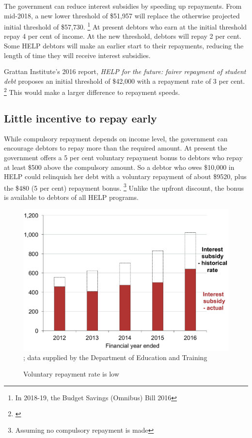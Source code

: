 \documentclass[embargoed]{grattan}
\begin{document}
The government can reduce interest subsidies by speeding up repayments.
From mid-2018, a new lower threshold of \$51,957 will replace the otherwise projected initial threshold of \$57,730.%
\footnote{In 2018-19, the Budget Savings (Omnibus) Bill 2016} At present debtors who earn at the initial threshold repay 4 per cent of income.
At the new threshold, debtors will repay 2 per cent.
Some \gls{HELP} debtors will make an earlier start to their repayments, reducing the length of time they will receive interest subsidies.

Grattan Institute's 2016 report, \emph{HELP for the future: fairer repayment of student debt} proposes an initial threshold of \$42,000 with a repayment rate of 3 per cent.%
\footnote{\textcite{Norton2016HELPfuturefairer}} This would make a larger difference to repayment speeds.

\subsection{Little incentive to repay early}\label{little-incentive-to-repay-early}

While compulsory repayment depends on income level, the government can encourage debtors to repay more than the required amount.
At present the government offers a 5 per cent voluntary repayment bonus to debtors who repay at least \$500 above the compulsory amount.
So a debtor who owes \$10,000 in \gls{HELP} could relinquish her debt with a voluntary repayment of about \$9520, plus the \$480 (5 per cent) repayment bonus.%
\footnote{Assuming no compulsory repayment is made} Unlike the upfront discount, the bonus is available to debtors of all \gls{HELP} programs.

\begin{figure}
\caption{Voluntary repayment rate is low}\label{fig:fig8-voluntary-repayment-rate-is-low}

\includegraphics[page=8]{atlas/Chartpack.pdf}
{\textcites{Jackson2003TheHigherEducationContributionScheme}{Education2015Highereducationreport}; data supplied by the Department of Education and Training}
\end{figure}
\end{document}
